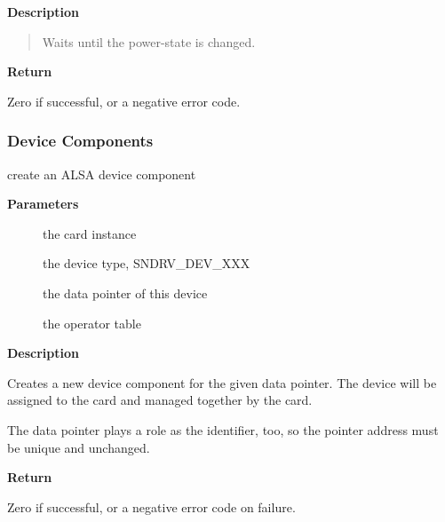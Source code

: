 \documentclass[a4paper,8pt,english]{sphinxmanual}
\begin{document}
\textbf{Description}
\begin{quote}

Waits until the power-state is changed.
\end{quote}

\textbf{Return}

Zero if successful, or a negative error code.


\subsubsection{Device Components}
\label{sound/kernel-api/alsa-driver-api:device-components}

\begin{fulllineitems}
\label{sound/kernel-api/alsa-driver-api:c.snd_device_new}
create an ALSA device component

\end{fulllineitems}


\textbf{Parameters}
\begin{description}
\item[{}] \leavevmode
the card instance

\item[{}] \leavevmode
the device type, SNDRV\_DEV\_XXX

\item[{}] \leavevmode
the data pointer of this device

\item[{}] \leavevmode
the operator table

\end{description}

\textbf{Description}

Creates a new device component for the given data pointer.
The device will be assigned to the card and managed together
by the card.

The data pointer plays a role as the identifier, too, so the
pointer address must be unique and unchanged.

\textbf{Return}

Zero if successful, or a negative error code on failure.
\end{document}
